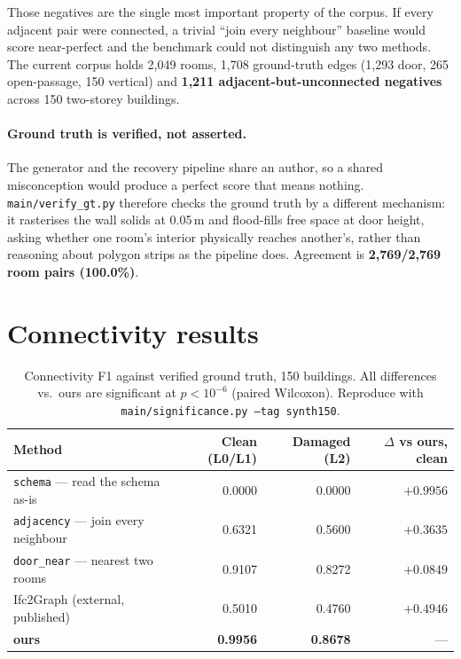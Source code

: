 \documentclass[11pt,a4paper]{article}
\begin{document}
Those negatives are the single most important property of the corpus. If every
adjacent pair were connected, a trivial ``join every neighbour'' baseline would
score near-perfect and the benchmark could not distinguish any two methods. The
current corpus holds 2{,}049 rooms, 1{,}708 ground-truth edges (1{,}293 door,
265 open-passage, 150 vertical) and \textbf{1{,}211 adjacent-but-unconnected
negatives} across 150 two-storey buildings.

\paragraph{Ground truth is verified, not asserted.}
The generator and the recovery pipeline share an author, so a shared
misconception would produce a perfect score that means nothing.
\texttt{main/verify\_gt.py} therefore checks the ground truth by a different
mechanism: it rasterises the wall solids at 0.05\,m and flood-fills free space
at door height, asking whether one room's interior physically reaches
another's, rather than reasoning about polygon strips as the pipeline does.
Agreement is \textbf{2{,}769/2{,}769 room pairs (100.0\%)}.

\section{Connectivity results}

\begin{table}[h]
\centering
\small
\begin{tabular}{lrrr}
\toprule
\textbf{Method} & \textbf{Clean (L0/L1)} & \textbf{Damaged (L2)} & \textbf{$\Delta$ vs ours, clean} \\
\midrule
\texttt{schema} --- read the schema as-is    & 0.0000 & 0.0000 & $+0.9956$ \\
\texttt{adjacency} --- join every neighbour  & 0.6321 & 0.5600 & $+0.3635$ \\
\texttt{door\_near} --- nearest two rooms    & 0.9107 & 0.8272 & $+0.0849$ \\
Ifc2Graph (external, published)              & 0.5010 & 0.4760 & $+0.4946$ \\
\textbf{ours}                                & \textbf{0.9956} & \textbf{0.8678} & --- \\
\bottomrule
\end{tabular}
\caption{Connectivity F1 against verified ground truth, 150 buildings. All
differences vs.\ ours are significant at $p<10^{-6}$ (paired Wilcoxon).
Reproduce with \texttt{main/significance.py --tag synth150}.}
\end{table}
\end{document}
